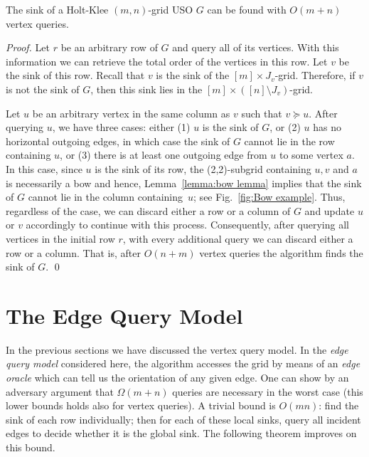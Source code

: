 \documentclass[runningheads,a4paper]{llncs}
\begin{document}
\begin{theorem}\label{theorem:Holt-Klee algorithm}
The sink of a Holt-Klee $(m,n)$-grid USO $G$ can be found with \linebreak$O(m+n)$ vertex queries.
\end{theorem}
\begin{proof}
Let $r$ be an arbitrary row of $G$ and query all of its vertices. With this information we can retrieve the total order of the vertices in this row. Let $v$ be the sink of this row.
Recall that $v$ is the sink of the $[m]\times J_v$-grid. %
Therefore, if $v$ is not the sink of $G$, then this sink lies in the $[m] \times ([n]\setminus J_v)$-grid. 

Let $u$ be an arbitrary vertex in the same column as $v$ such that $v\succeq u$. After querying $u$, we have three cases:
either (1) $u$ is the sink of $G$, or (2)
 $u$ has no horizontal outgoing edges, in which case the sink of $G$ cannot lie in the row containing $u$, or (3) there is at least one outgoing edge from $u$ to some vertex $a$. 
In this case, since $u$ is the sink of its row, the (2,2)-subgrid containing $u,v$ and $a$ is necessarily a bow and hence, Lemma~\ref{lemma:bow lemma} implies that the sink of $G$ cannot lie in the column containing~$u$; see Fig.~\ref{fig:Bow example}.
Thus, regardless of the case, we can discard either a row or a column of $G$ and update  $u$ or $v$ accordingly to continue with this process.
Consequently, after querying all vertices in the initial row $r$, with every additional query we can discard either a row or a column. That is, after $O(n+ m)$ vertex queries the algorithm finds the sink of $G$.
\qed
\end{proof}

\section{The Edge Query Model}
\label{section:The edge query model}

In the previous sections we have discussed the vertex query model.
In the \emph{edge query model} considered here, the algorithm accesses the
grid by means of an \emph{edge oracle} which can tell us
the orientation of any given edge.
One can show by an adversary argument that $\Omega(m+n)$ queries are necessary in the worst case (this lower bounds holds also for vertex queries).
A trivial bound is $O(mn)$: find the sink of each row individually; then
for each of these local sinks, query all incident edges to decide whether it
is the global sink.
The following theorem improves on this bound.
\end{document}
